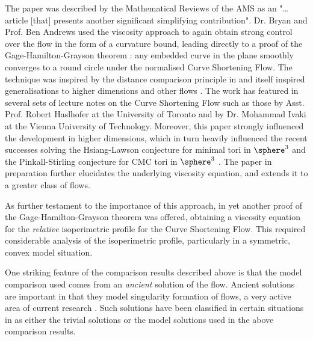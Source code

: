 \documentclass[12pt]{amsart}
\begin{document}
The paper \cite{MR2794630} was described by the Mathematical Reviews of the AMS as an "\ldots{}article [that] presents another significant simplifying contribution". Dr. Bryan and Prof. Ben Andrews used the viscosity approach to again obtain strong control over the flow in the form of a curvature bound, leading directly to a proof of the Gage-Hamilton-Grayson theorem \cite{MR840401,MR906392}: any embedded curve in the plane smoothly converges to a round circle under the normalised Curve Shortening Flow. The technique was inspired by the distance comparison principle in \cite{MR1656553} and itself inspired generalisations to higher dimensions \cite{MR2967056,MR3011290} and other flows \cite{MR3570462}. The work has featured in several sets of lecture notes on the Curve Shortening Flow such as those by Asst. Prof. Robert Haslhofer at the University of Toronto and by Dr. Mohammad Ivaki at the Vienna University of Technology. Moreover, this paper strongly influenced the development in higher dimensions, which in turn heavily influenced the recent successes solving the Hsiang-Lawson conjecture \cite{MR3143888} for minimal tori in \(\sphere^3\) and the Pinkall-Stirling conjecture for CMC tori in \(\sphere^3\) \cite{2012arXiv1204.5007A}. The paper \cite{alpha_csf_dist_comp} in preparation further elucidates the underlying viscosity equation, and extends it to a greater class of flows.

As further testament to the importance of this approach, in \cite{MR2843240} yet another proof of the Gage-Hamilton-Grayson theorem was offered, obtaining a viscosity equation for the \emph{relative} isoperimetric profile for the Curve Shortening Flow. This required considerable analysis of the isoperimetric profile, particularly in a symmetric, convex model situation.

One striking feature of the comparison results described above is that the model comparison used comes from an \emph{ancient} solution of the flow. Ancient solutions are important in that they model singularity formation of flows, a very active area of current research \cite{MR3020169,MR2993752}. Such solutions have been classified in certain situations in \cite{MR2669361, MR2971286} as either the trivial solutions or the model solutions used in the above comparison results.
\end{document}
